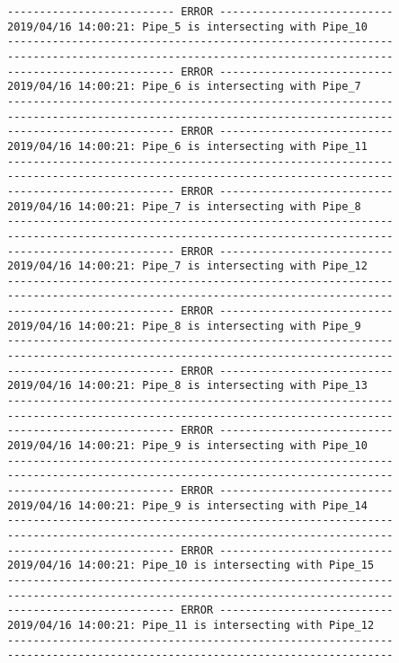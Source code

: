 \documentclass{article}
\begin{document}
{\begin{verbatim}
-------------------------- ERROR ---------------------------
2019/04/16 14:00:21: Pipe_5 is intersecting with Pipe_10
------------------------------------------------------------
------------------------------------------------------------
-------------------------- ERROR ---------------------------
2019/04/16 14:00:21: Pipe_6 is intersecting with Pipe_7
------------------------------------------------------------
------------------------------------------------------------
-------------------------- ERROR ---------------------------
2019/04/16 14:00:21: Pipe_6 is intersecting with Pipe_11
------------------------------------------------------------
------------------------------------------------------------
-------------------------- ERROR ---------------------------
2019/04/16 14:00:21: Pipe_7 is intersecting with Pipe_8
------------------------------------------------------------
------------------------------------------------------------
-------------------------- ERROR ---------------------------
2019/04/16 14:00:21: Pipe_7 is intersecting with Pipe_12
------------------------------------------------------------
------------------------------------------------------------
-------------------------- ERROR ---------------------------
2019/04/16 14:00:21: Pipe_8 is intersecting with Pipe_9
------------------------------------------------------------
------------------------------------------------------------
-------------------------- ERROR ---------------------------
2019/04/16 14:00:21: Pipe_8 is intersecting with Pipe_13
------------------------------------------------------------
------------------------------------------------------------
-------------------------- ERROR ---------------------------
2019/04/16 14:00:21: Pipe_9 is intersecting with Pipe_10
------------------------------------------------------------
------------------------------------------------------------
-------------------------- ERROR ---------------------------
2019/04/16 14:00:21: Pipe_9 is intersecting with Pipe_14
------------------------------------------------------------
------------------------------------------------------------
-------------------------- ERROR ---------------------------
2019/04/16 14:00:21: Pipe_10 is intersecting with Pipe_15
------------------------------------------------------------
------------------------------------------------------------
-------------------------- ERROR ---------------------------
2019/04/16 14:00:21: Pipe_11 is intersecting with Pipe_12
------------------------------------------------------------
------------------------------------------------------------

\end{verbatim}}
\end{document}
